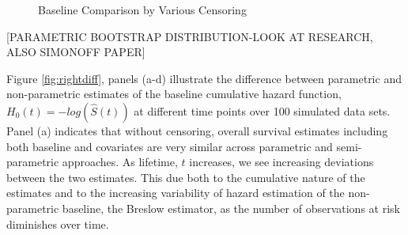\documentclass[12pt,letterpaper]{article}
\begin{document}
\begin{figure}[h!]
	\caption{Baseline Comparison by Various Censoring}
	\label{fig:rightbase}
\end{figure}


[PARAMETRIC BOOTSTRAP DISTRIBUTION-LOOK AT RESEARCH, ALSO SIMONOFF PAPER]

Figure \ref{fig:rightdiff}, panels (a-d) illustrate the difference between parametric and non-parametric estimates of the baseline cumulative hazard function, $H_0(t) = -log(\hat{S}(t))$ at different time points over 100 simulated data sets.  Panel (a) indicates that without censoring, overall survival estimates including both baseline and covariates are very similar across parametric and semi-parametric approaches.  As lifetime, $t$ increases, we see increasing deviations between the two estimates.  This due both to the cumulative nature of the estimates and to the increasing variability of hazard estimation of the non-parametric baseline, the Breslow estimator,   \citep{DavHink1997,Burr1994} as the number of observations at risk diminishes over time.
\end{document}
